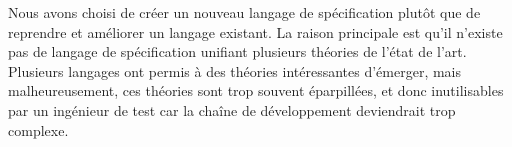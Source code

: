 Nous avons choisi de créer un nouveau langage de spécification plutôt que de
reprendre et améliorer un langage existant.
La raison principale est qu'il n'existe pas de langage de spécification unifiant
plusieurs théories de l'état de l'art. Plusieurs langages ont permis à des
théories intéressantes d'émerger, mais malheureusement, ces théories sont
trop souvent éparpillées, et donc inutilisables par un ingénieur de test car la
chaîne de développement deviendrait trop complexe.


%  
%  
%  
%  
%  
%  
%  
%  
%  
%  
%  
